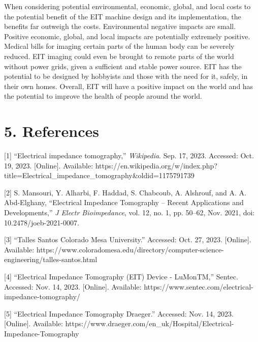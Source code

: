 When considering potential environmental, economic, global, and local
costs to the potential benefit of the EIT machine design and its
implementation, the benefits far outweigh the costs. Environmental
negative impacts are small. Positive economic, global, and local impacts
are potentially extremely positive. Medical bills for imaging certain
parts of the human body can be severely reduced. EIT imaging could even
be brought to remote parts of the world without power grids, given a
sufficient and stable power source. EIT has the potential to be designed
by hobbyists and those with the need for it, safely, in their own homes.
Overall, EIT will have a positive impact on the world and has the
potential to improve the health of people around the world.

\section*{}\label{section}

\section*{5. References~}\label{references}

{[}1{]} ``Electrical impedance tomography,'' \emph{Wikipedia}. Sep. 17,
2023. Accessed: Oct. 19, 2023. {[}Online{]}. Available:
https://en.wikipedia.org/w/index.php?title=Electrical\_impedance\_tomography\&oldid=1175791739

{[}2{]} S. Mansouri, Y. Alharbi, F. Haddad, S. Chabcoub, A. Alshrouf,
and A. A. Abd-Elghany, ``Electrical Impedance Tomography -- Recent
Applications and Developments,'' \emph{J Electr Bioimpedance}, vol. 12,
no. 1, pp. 50--62, Nov. 2021, doi: 10.2478/joeb-2021-0007.

{[}3{]} ``Talles Santos \textbar{} Colorado Mesa University.'' Accessed:
Oct. 27, 2023. {[}Online{]}. Available:
https://www.coloradomesa.edu/directory/computer-science-engineering/talles-santos.html

{[}4{]} ``Electrical Impedance Tomography (EIT) Device - LuMonTM,''
Sentec. Accessed: Nov. 14, 2023. {[}Online{]}. Available:
https://www.sentec.com/electrical-impedance-tomography/

{[}5{]} ``Electrical Impedance Tomography \textbar{} Draeger.''
Accessed: Nov. 14, 2023. {[}Online{]}. Available:
https://www.draeger.com/en\_uk/Hospital/Electrical-Impedance-Tomography

